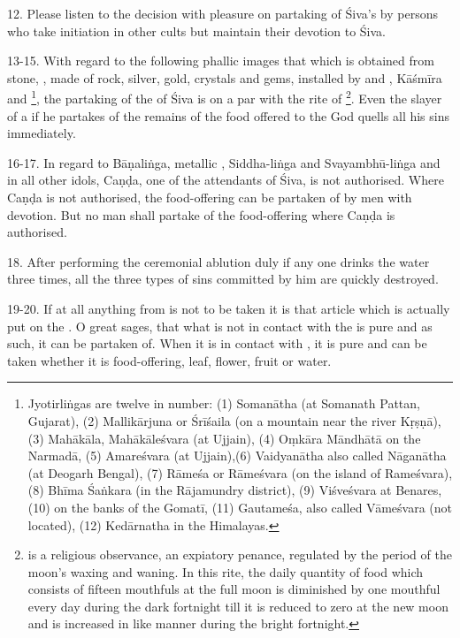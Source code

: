 12. Please listen to the decision with pleasure on partaking of Śiva’s
 by persons who take initiation in other cults but maintain their
devotion to Śiva.

13-15. With regard to the following phallic images \viz that which is obtained
from  stone, ,  made of rock, silver,
gold, crystals and gems,  installed by  and ,
Kāśmīra  and \footnote{Jyotirliṅgas are twelve in
number: (1) Somanātha (at Somanath Pattan, Gujarat), (2) Mallikārjuna or Śrīśaila
(on a mountain near the river Kṛṣṇā), (3) Mahākāla, Mahākāleśvara (at Ujjain),
(4) Oṃkāra Māndhātā on the Narmadā, (5) Amareśvara (at Ujjain),(6) Vaidyanātha
also called Nāganātha (at Deogarh Bengal), (7) Rāmeśa or Rāmeśvara (on the island
of Rameśvara), (8) Bhīma Śaṅkara (in the Rājamundry district), (9) Viśveśvara at
Benares, (10) on the banks of the Gomatī, (11) Gautameśa, also called Vāmeśvara
(not located), (12) Kedārnatha in the Himalayas.}, the partaking of
the  of Śiva is on a par with the rite of 
\footnote{ is a religious observance, an expiatory penance,
regulated by the period of the moon’s waxing and waning. In this rite, the daily
quantity of food which consists of fifteen mouthfuls at the full moon is
diminished by one mouthful every day during the dark fortnight till it is
reduced to zero at the new moon and is increased in like manner during the bright
fortnight.}. Even the slayer of a  if he partakes of the remains of
the food offered to the God quells all his sins immediately.

16-17. In regard to Bāṇaliṅga, metallic , Siddha-liṅga and
Svayambhū-liṅga and in all other idols, Caṇḍa, one of the attendants of Śiva, is
not authorised. Where Caṇḍa is not authorised, the food-offering can be partaken
of by men with devotion. But no man shall partake of the food-offering where
Caṇḍa is authorised.

18. After performing the ceremonial ablution duly if any one drinks the water
three times, all the three types of sins committed by him are quickly destroyed.

19-20. If at all anything from  is not to be taken it is that
article which is actually put on the . O great sages, that what is not
in contact with the  is pure and as such, it can be partaken of. When
it is in contact with , it is pure and can be taken whether
it is food-offering, leaf, flower, fruit or water.

